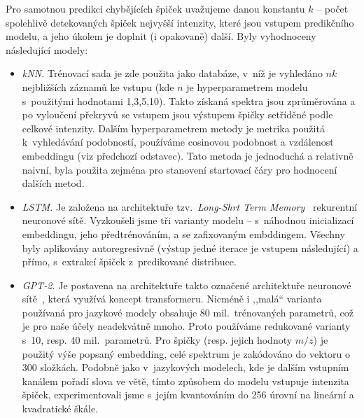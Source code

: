 \documentclass[a4paper,11pt]{article}
\begin{document}
Pro samotnou predikci chybějících špiček 
uvažujeme danou konstantu $k$ -- počet spolehlivě detekovaných špiček nejvyšší intenzity,
které jsou vstupem predikčního modelu, a jeho úkolem je doplnit (i opakovaně) další. 
Byly vyhodnoceny následující modely:
\begin{itemize}
\item \emph{kNN.} Trénovací sada je zde použita jako databáze, v~níž je vyhledáno $nk$ nejbližších 
záznamů ke vstupu (kde $n$ je hyperparametrem modelu s~použitými hodnotami 1,3,5,10). 
Takto získaná spektra jsou zprůměrována a po vyloučení překryvů se vstupem jsou výstupem špičky setříděné
podle celkové intenzity.
Dalším hyperparametrem metody je metrika použitá k~vyhledávání podobností, používáme cosinovou podobnost
a vzdálenost embeddingu (viz předchozí odstavec).
Tato metoda je jednoduchá a relativně naivní, byla použita zejména pro stanovení startovací čáry pro hodnocení
dalších metod.
\item \emph{LSTM.} Je založena na architektuře tzv.~\emph{Long-Shrt Term Memory}~\cite{lstm} rekurentní neuronové sítě.
Vyzkoušeli jsme tři varianty modelu -- s~náhodnou inicializací embeddingu, jeho předtrénováním, a se zafixovaným embddingem.
Všechny byly aplikovány autoregresivně (výstup jedné iterace je vstupem následující) a přímo, s~extrakcí špiček z~predikované distribuce.

\item \emph{GPT-2.} Je postavena na architektuře takto označené architektuře neuronové sítě~\cite{gpt2},
která využívá koncept transformeru.
Nicméně i ,,malá`` varianta používaná pro jazykové modely obsahuje 80 mil.\ trénovaných parametrů,
což je pro naše účely neadekvátně mnoho. Proto používáme redukované varianty s~10, resp. 40 mil.\ parametrů.
Pro špičky (resp. jejich hodnoty $m/z$) je použitý výše popsaný embedding, celé spektrum je zakódováno do vektoru
o 300 složkách.
Podobně jako v~jazykových modelech, kde je dalším vstupním kanálem pořadí slova ve větě,
tímto způsobem do modelu vstupuje intenzita špiček, experimentovali jsme s~jejím kvantováním do 256 úrovní
na lineární a kvadratické škále.


\end{itemize}
\end{document}
